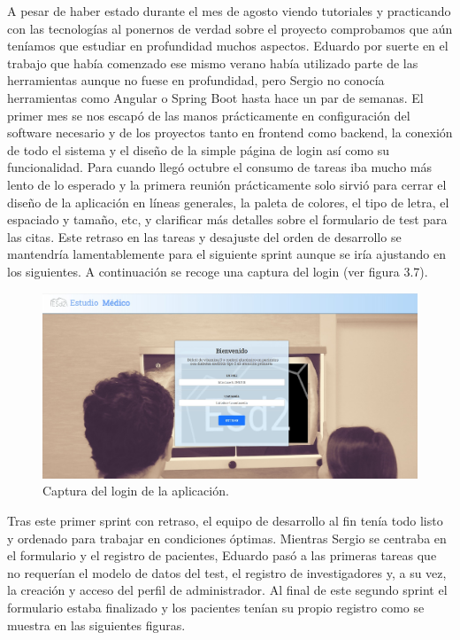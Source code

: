 A pesar de haber estado durante el mes de agosto viendo tutoriales y practicando con las tecnologías al ponernos de verdad sobre el proyecto comprobamos que aún teníamos que estudiar en profundidad muchos aspectos. Eduardo por suerte en el trabajo que había comenzado ese mismo verano había utilizado parte de las herramientas aunque no fuese en profundidad, pero Sergio no conocía herramientas como Angular o Spring Boot hasta hace un par de semanas. El primer mes se nos escapó de las manos prácticamente en configuración del software necesario y de los proyectos tanto en frontend como backend, la conexión de todo el sistema y el diseño de la simple página de login así como su funcionalidad. Para cuando llegó octubre el consumo de tareas iba mucho más lento de lo esperado y la primera reunión prácticamente solo sirvió para cerrar el diseño de la aplicación en líneas generales, la paleta de colores, el tipo de letra, el espaciado y tamaño, etc, y clarificar más detalles sobre el formulario de test para las citas. Este retraso en las tareas y desajuste del orden de desarrollo se mantendría lamentablemente para el siguiente sprint aunque se iría ajustando en los siguientes. A continuación se recoge una captura del login (ver figura 3.7).
\newline

 \begin{figure}[h]
    \centering
     \includegraphics[width=1\textwidth]{images/login.jpg}
    \caption{Captura del login de la aplicación.}
\end{figure}
\newpage

Tras este primer sprint con retraso, el equipo de desarrollo al fin tenía todo listo y ordenado para trabajar en condiciones óptimas. Mientras Sergio se centraba en el formulario y el registro de pacientes, Eduardo pasó a las primeras tareas que no requerían el modelo de datos del test, el registro de investigadores y, a su vez, la creación y acceso del perfil de administrador. Al final de este segundo sprint el formulario estaba finalizado y los pacientes tenían su propio registro como se muestra en las siguientes figuras.
\newline

